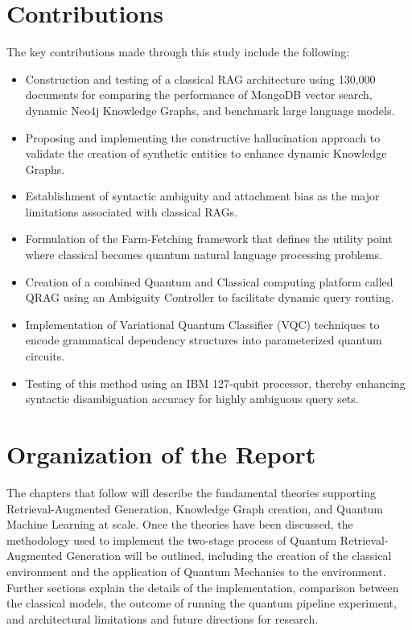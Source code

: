\section{Contributions}

The key contributions made through this study include the following:

\begin{itemize}
	\item Construction and testing of a classical RAG architecture using 130,000 documents for comparing the performance of MongoDB vector search, dynamic Neo4j Knowledge Graphs, and benchmark large language models.
	\item Proposing and implementing the constructive hallucination approach to validate the creation of synthetic entities to enhance dynamic Knowledge Graphs.
	\item Establishment of syntactic ambiguity and attachment bias as the major limitations associated with classical RAGs.
	\item Formulation of the Farm-Fetching framework that defines the utility point where classical becomes quantum natural language processing problems.
	\item Creation of a combined Quantum and Classical computing platform called QRAG using an Ambiguity Controller to facilitate dynamic query routing.
	\item Implementation of Variational Quantum Classifier (VQC) techniques to encode grammatical dependency structures into parameterized quantum circuits.
	\item Testing of this method using an IBM 127-qubit processor, thereby enhancing syntactic disambiguation accuracy for highly ambiguous query sets.
\end{itemize}

\section{Organization of the Report}

The chapters that follow will describe the fundamental theories supporting Retrieval-Augmented Generation, Knowledge Graph creation, and Quantum Machine Learning at scale. Once the theories have been discussed, the methodology used to implement the two-stage process of Quantum Retrieval-Augmented Generation will be outlined, including the creation of the classical environment and the application of Quantum Mechanics to the environment. Further sections explain the details of the implementation, comparison between the classical models, the outcome of running the quantum pipeline experiment, and architectural limitations and future directions for research.